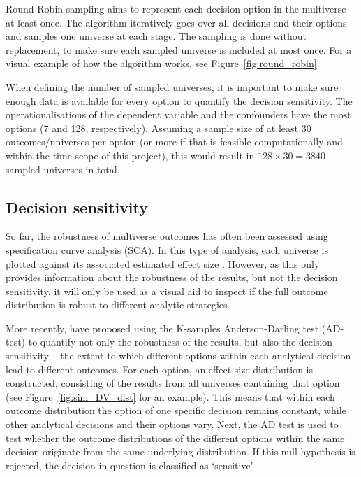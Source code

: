 \documentclass{article}
\begin{document}
Round Robin sampling aims to represent each decision option in the multiverse at least once. The algorithm iteratively goes over all decisions and their options and samples one universe at each stage. The sampling is done without replacement, to make sure each sampled universe is included at most once. For a visual example of how the algorithm works, see Figure~\ref{fig:round_robin}. 

When defining the number of sampled universes, it is important to make sure enough data is available for every option to quantify the decision sensitivity. The operationalisations of the dependent variable and the confounders have the most options (7 and 128, respectively). Assuming a sample size of at least 30 outcomes/universes per option (or more if that is feasible computationally and within the time scope of this project), this would result in $128 \times 30 = 3840$ sampled universes in total.

\subsection*{Decision sensitivity}
So far, the robustness of multiverse outcomes has often been assessed using specification curve analysis (SCA). In this type of analysis, each universe is plotted against its associated estimated effect size \citep{simonsohn_specification_2015}. However, as this only provides information about the robustness of the results, but not the decision sensitivity, it will only be used as a visual aid to inspect if the full outcome distribution is robust to different analytic strategies.

More recently, \citet{liu_approximation_2023} have proposed using the K-samples Anderson-Darling test (AD-test) to quantify not only the robustness of the results, but also the decision sensitivity – the extent to which different options within each analytical decision lead to different outcomes. For each option, an effect size distribution is constructed, consisting of the results from all universes containing that option (see Figure~\ref{fig:sim_DV_dist} for an example). This means that within each outcome distribution the option of one specific decision remains constant, while other analytical decisions and their options vary. Next, the AD test is used to test whether the outcome distributions of the different options within the same decision originate from the same underlying distribution. If this null hypothesis is rejected, the decision in question is classified as `sensitive'.
\end{document}
